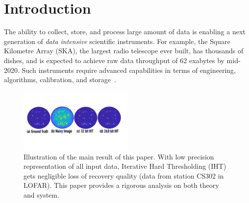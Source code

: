 \documentclass{article}
\begin{document}
\vspace{-2.5em}
\section{Introduction}
\vspace{-.5em}

The ability to collect, store, and process large amount of
data is enabling a next generation of {\em data intensive} scientific 
instruments. For example,
the Square Kilometre Array (SKA), the largest
radio telescope ever built, has thousands of 
dishes, and is expected to achieve
raw data throughput of 62 exabytes by mid-2020.
Such instruments require advanced  
capabilities in terms of engineering, algorithms, calibration, and storage~\cite{hu}. 

\begin{figure}\label{sky_images}
  \centering
    \includegraphics[width=0.5\textwidth]{figs/sky_images2.pdf}
  \vspace{-2em}
  \caption{Illustration of the main result of this paper. With
  low precision representation of all input data, 
  Iterative Hard Thresholding (IHT) gets negligible loss
  of recovery quality (data from station CS302 in LOFAR). This paper provides a rigorous analysis
  on both theory and system.}
  \label{fig:sky_images}
\end{figure}
\end{document}
